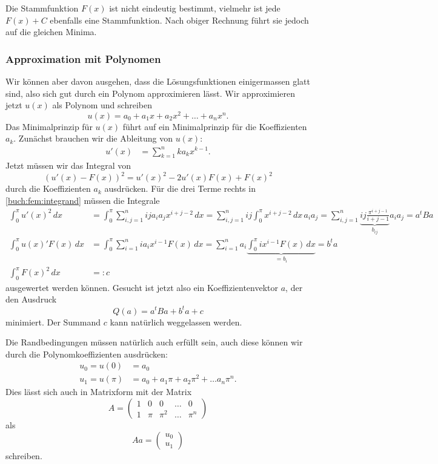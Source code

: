 Die Stammfunktion $F(x)$ ist nicht eindeutig bestimmt, vielmehr
ist jede $F(x)+C$ ebenfalls eine Stammfunktion.
Nach obiger Rechnung führt sie jedoch auf die gleichen Minima.

\subsubsection{Approximation mit Polynomen}
Wir können aber davon ausgehen, dass die Lösungsfunktionen einigermassen
glatt sind, also sich gut durch ein Polynom approximieren lässt.
Wir approximieren jetzt $u(x)$ als Polynom und schreiben
\[
u(x) = a_0 + a_1x + a_2x^2 + \dots + a_nx^n.
\]
Das Minimalprinzip für $u(x)$ führt auf ein Minimalprinzip für 
die Koeffizienten $a_k$.
Zunächst brauchen wir die Ableitung von $u(x)$:
\begin{align*}
u'(x) &= \sum_{k=1}^n ka_kx^{k-1}.
\end{align*}
Jetzt müssen wir das Integral von
\begin{equation}
(u'(x)-F(x))^2
=
u'(x)^2 - 2u'(x)F(x) + F(x)^2
\label{buch:fem:integrand}
\end{equation}
durch 
die Koeffizienten $a_k$ ausdrücken.
Für die drei Terme rechts in \eqref{buch:fem:integrand} müssen die Integrale
\begin{align*}
\int_0^\pi u'(x)^2\,dx
&=
\int_0^\pi
\sum_{i,j=1}^n ija_ia_jx^{i+j-2}
\,dx
=
\sum_{i,j=1}^n ij \int_0^\pi x^{i+j-2}\,dx\, a_ia_j
=
\sum_{i,j=1}^n
\underbrace{ij \frac{\pi^{i+j-1}}{i+j-1}}_{\displaystyle b_{ij}}
a_ia_j
=
a^tBa
\\
\int_0^\pi u(x)'F(x) \,dx
&=
\int_0^\pi \sum_{i=1}^n ia_i x^{i-1} F(x) \,dx
=
\sum_{i=1}^n
a_i
\underbrace{\int_0^\pi 
ix^{i-1} F(x)\,dx}_{\displaystyle =b_i}
=
b^t a
\\
\int_0^\pi F(x)^2\,dx &=: c
\end{align*}
ausgewertet werden können.
Gesucht ist jetzt also ein Koeffizientenvektor $a$, der den Ausdruck
\[
Q(a) = a^t B a + b^t a + c
\]
minimiert.
Der Summand $c$ kann natürlich weggelassen werden.

Die Randbedingungen müssen natürlich auch erfüllt sein, auch
diese können wir durch die Polynomkoeffizienten ausdrücken:
\begin{align*}
u_0=u(0)   &= a_0
\\
u_1=u(\pi) &= a_0 + a_1\pi + a_2\pi^2+\dots a_n\pi^n.
\end{align*}
Dies lässt sich auch in Matrixform mit der Matrix
\[
A=\begin{pmatrix}
1&0&0&\dots&0\\
1&\pi&\pi^2&\dots&\pi^n
\end{pmatrix}
\]
als
\[
Aa = \begin{pmatrix}u_0\\u_1\end{pmatrix}
\]
schreiben.

